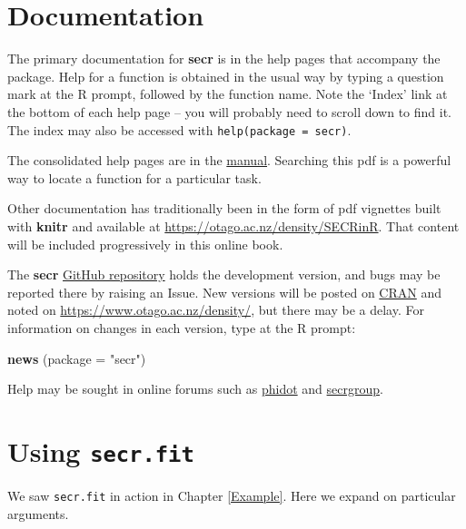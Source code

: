 \documentclass[
]{book}
\newenvironment{Shaded}{\begin{snugshade}}{\end{snugshade}}
\newcommand{\AttributeTok}[1]{\textcolor[rgb]{0.13,0.29,0.53}{#1}}
\newcommand{\FunctionTok}[1]{\textcolor[rgb]{0.13,0.29,0.53}{\textbf{#1}}}
\newcommand{\NormalTok}[1]{#1}
\newcommand{\StringTok}[1]{\textcolor[rgb]{0.31,0.60,0.02}{#1}}
\begin{document}
\section{Documentation}\label{documentation}


The primary documentation for \textbf{secr} is in the help pages that accompany the package. Help for a function is obtained in the usual way by typing a question mark at the R prompt, followed by the function name. Note the `Index' link at the bottom of each help page -- you will probably need to scroll down to find it. The index may also be accessed with \texttt{help(package\ =\ secr)}.

The consolidated help pages are in the \href{https://CRAN.R-project.org/package=secr/secr.pdf}{manual}. Searching this pdf is a powerful way to locate a function for a particular task.

Other documentation has traditionally been in the form of pdf vignettes built with \textbf{knitr} and available at \url{https://otago.ac.nz/density/SECRinR}. That content will be included progressively in this online book.

The \textbf{secr} \href{https://github.com/MurrayEfford/secr}{GitHub repository} holds the development version, and bugs may be reported there by raising an Issue. New versions will be posted on \href{https://cran.r-project.org/package=secr}{CRAN} and noted on \url{https://www.otago.ac.nz/density/}, but there may be a delay. For information on changes in each version, type at the R prompt:

\begin{Shaded}
\begin{Highlighting}[]
\FunctionTok{news}\NormalTok{ (}\AttributeTok{package =} \StringTok{"secr"}\NormalTok{) }
\end{Highlighting}
\end{Shaded}

Help may be sought in online forums such as \href{http://www.phidot.org/forum/}{phidot} and \href{https://groups.google.com/forum/\#!forum/secrgroup}{secrgroup}.

\section{\texorpdfstring{Using \texttt{secr.fit}}{Using secr.fit}}\label{using-secr.fit}

We saw \texttt{secr.fit} in action in Chapter \ref{Example}. Here we expand on particular arguments.
\end{document}

